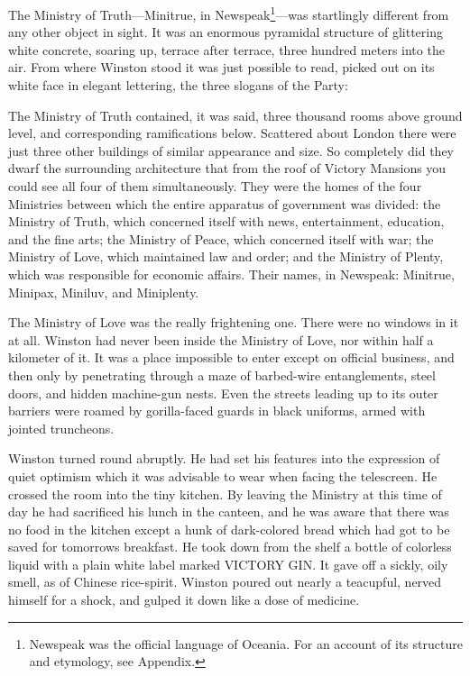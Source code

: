 The Ministry of Truth---Minitrue, in Newspeak\footnote{Newspeak was the
  official language of Oceania. For an account of its structure and
  etymology, see Appendix.}---was startlingly different from any other
object in sight. It was an enormous pyramidal structure of glittering white
concrete, soaring up, terrace after terrace, three hundred meters into the
air. From where Winston stood it was just possible to read, picked out on
its white face in elegant lettering, the three slogans of the Party:


The Ministry of Truth contained, it was said, three thousand rooms above
ground level, and corresponding ramifications below. Scattered about
London there were just three other buildings of similar appearance and
size. So completely did they dwarf the surrounding architecture that
from the roof of Victory Mansions you could see all four of them
simultaneously. They were the homes of the four Ministries between which
the entire apparatus of government was divided: the Ministry of Truth,
which concerned itself with news, entertainment, education, and the fine
arts; the Ministry of Peace, which concerned itself with war; the
Ministry of Love, which maintained law and order; and the Ministry of
Plenty, which was responsible for economic affairs. Their names, in
Newspeak: Minitrue, Minipax, Miniluv, and Miniplenty.

The Ministry of Love was the really frightening one. There were no
windows in it at all. Winston had never been inside the Ministry of
Love, nor within half a kilometer of it. It was a place impossible to
enter except on official business, and then only by penetrating through
a maze of barbed-wire entanglements, steel doors, and hidden machine-gun
nests. Even the streets leading up to its outer barriers were roamed by
gorilla-faced guards in black uniforms, armed with jointed truncheons.

Winston turned round abruptly. He had set his features into the
expression of quiet optimism which it was advisable to wear when facing
the telescreen. He crossed the room into the tiny kitchen. By leaving
the Ministry at this time of day he had sacrificed his lunch in the
canteen, and he was aware that there was no food in the kitchen except a
hunk of dark-colored bread which had got to be saved for
tomorrow\textquotesingle s breakfast. He took down from the shelf a
bottle of colorless liquid with a plain white label marked \textsc{VICTORY
GIN}. It gave off a sickly, oily smell, as of Chinese rice-spirit.
Winston poured out nearly a teacupful, nerved himself for a shock, and
gulped it down like a dose of medicine.

